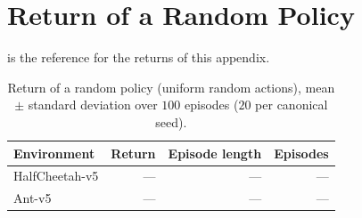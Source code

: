 \section{Return of a Random Policy}\label{sec:app-learn-random}

 is the reference for the returns of this appendix.

\begin{table}[tbp]
  \centering
  \caption{Return of a random policy (uniform random actions), mean $\pm$ standard deviation over $100$ episodes ($20$ per canonical seed).}
  \label{tab:app-random}
  \begin{tabular}{lrrr}
    \toprule
    Environment    & Return & Episode length & Episodes \\
    \midrule
    HalfCheetah-v5 & ---    & ---            & ---      \\
    Ant-v5         & ---    & ---            & ---      \\
    \bottomrule
  \end{tabular}
\end{table}
